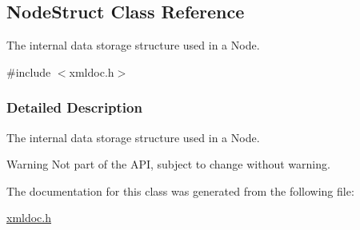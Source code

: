\hypertarget{classNodeStruct}{
\subsection{NodeStruct Class Reference}
\label{classNodeStruct}
}


The internal data storage structure used in a Node.  




{\ttfamily \#include $<$xmldoc.h$>$}



\subsubsection{Detailed Description}
The internal data storage structure used in a Node. \begin{DoxyWarning}{Warning}
Not part of the API, subject to change without warning. 
\end{DoxyWarning}


The documentation for this class was generated from the following file:\begin{DoxyCompactItemize}
\item 
\hyperlink{xmldoc_8h}{xmldoc.h}\end{DoxyCompactItemize}
